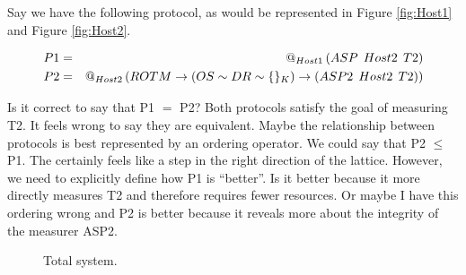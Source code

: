 \documentclass[12pt, letterpaper]{article}
\begin{document}

\pagebreak
Say we have the following protocol, as would be represented in Figure \ref{fig:Host1} and Figure \ref{fig:Host2}.

\begin{eqnarray*}
  P1 &=& \mathop{@_{Host1}}{(}ASP\:\: Host2\:\: T2) \\
  P2 &=& \mathop{@_{Host2}}{(ROTM \to ( OS \stackrel{}{\sim} DR \stackrel{}{\sim} \{ \}_{K} ) \to (ASP2\:\: Host2\:\: T2))}
\end{eqnarray*}

Is it correct to say that P1 $=$ P2? Both protocols satisfy the goal of measuring T2. It feels wrong to say they are equivalent. Maybe the relationship between protocols is best represented by an ordering operator. We could say that P2 $\leq$ P1. The certainly feels like a step in the right direction of the lattice. However, we need to explicitly define how P1 is ``better''. Is it better because it more directly measures T2 and therefore requires fewer resources. Or maybe I have this ordering wrong and P2 is better because it reveals more about the integrity of the measurer ASP2. 



\begin{figure}[]
  \centering 
  \caption{Total system.}
  \label{fig:System1}
\end{figure}
\end{document}
